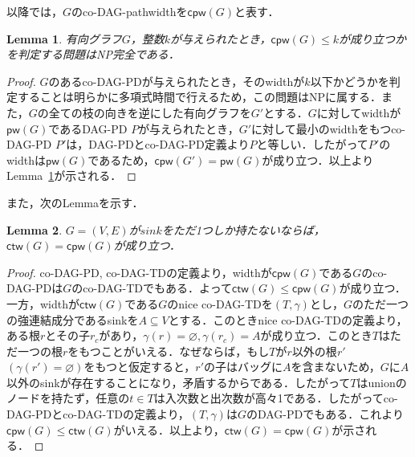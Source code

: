 \documentclass[master]{kuisthesis}		%
\theoremstyle{plain}
\newtheorem{lemma}{Lemma}
\theoremstyle{definition}
\begin{document}
以降では，$G$のco-DAG-pathwidthを$\mathsf{cpw}(G)$と表す．





\begin{lemma}\label{co-DAG-PD}
    有向グラフ$G$，整数$k$が与えられたとき，$\mathsf{cpw}(G) \leq k$が成り立つかを判定する問題はNP完全である．
\end{lemma}

\begin{proof}
    $G$のあるco-DAG-PDが与えられたとき，そのwidthが$k$以下かどうかを判定することは明らかに多項式時間で行えるため，この問題はNPに属する．また，$G$の全ての枝の向きを逆にした有向グラフを$G'$とする．$G$に対してwidthが$\mathsf{pw}(G)$であるDAG-PD $P$が与えられたとき，$G'$に対して最小のwidthをもつco-DAG-PD $P'$は，DAG-PDとco-DAG-PD定義より$P$と等しい．したがって$P'$のwidthは$\mathsf{pw}(G)$であるため，$\mathsf{cpw}(G')= \mathsf{pw}(G)$が成り立つ．以上よりLemma~\ref{co-DAG-PD}が示される．
\end{proof}





また，次のLemmaを示す．

\begin{lemma}\label{r-sink}
    $G =(V, E)$が$sink$をただ1つしか持たないならば，$\mathsf{ctw}(G) = \mathsf{cpw}(G)$が成り立つ．
\end{lemma}

\begin{proof}
    co-DAG-PD, co-DAG-TDの定義より，widthが$\mathsf{cpw}(G)$である$G$のco-DAG-PDは$G$のco-DAG-TDでもある．よって$\mathsf{ctw}(G) \leq \mathsf{cpw}(G)$が成り立つ．一方，widthが$\mathsf{ctw}(G)$である$G$のnice co-DAG-TDを$(T, \gamma)$とし，$G$のただ一つの強連結成分であるsinkを$A \subseteq V$とする．このときnice co-DAG-TDの定義より，ある根$r$とその子$r_c$があり，$\gamma(r) = \varnothing, \gamma(r_c) = A$が成り立つ．このとき$T$はただ一つの根$r$をもつことがいえる．なぜならば，もし$T$が$r$以外の根$r'$ $(\gamma(r') = \varnothing)$をもつと仮定すると，$r'$の子はバッグに$A$を含まないため，$G$に$A$以外のsinkが存在することになり，矛盾するからである．したがって$T$はunionのノードを持たず，任意の$t \in T$は入次数と出次数が高々1である．したがってco-DAG-PDとco-DAG-TDの定義より，$(T, \gamma)$は$G$のDAG-PDでもある．これより$\mathsf{cpw}(G) \leq \mathsf{ctw}(G)$がいえる．以上より，$\mathsf{ctw}(G) = \mathsf{cpw}(G)$が示される．
\end{proof}
\end{document}

